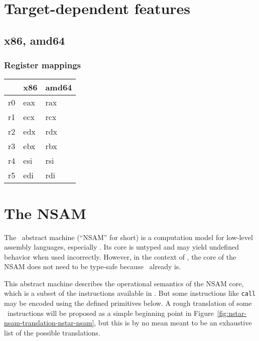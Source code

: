 \chapter{Target-dependent features}\label{chap:nstar-specific}

\section{x86, amd64}\label{sec:nstar-specific-x86amd64}

\subsection{Register mappings}\label{subsec:nstar-specific-x86amd64-registers}

\begin{tabularx}{\textwidth}{Y Y Y}
	\toprule
	\nstar & x86 & amd64 \\
	\midrule
	r0     & eax & rax   \\
	r1     & ecx & rcx   \\
	r2     & edx & rdx   \\
	r3     & ebx & rbx   \\
	r4     & esi & rsi   \\
	r5     & edi & rdi   \\
	\bottomrule
\end{tabularx}

\chapter{The NSAM}\label{chap:nstar-nsam}


The \nstar\ abstract machine (``NSAM'' for short) is a computation model for low-level assembly languages, especially \nstar.
Its core is untyped and may yield undefined behavior when used incorrectly.
However, in the context of \nstar, the core of the NSAM does not need to be type-safe because \nstar\ already is.

This abstract machine describes the operational semantics of the NSAM core, which is a subset of the instructions available in \nstar.
But some instructions like \texttt{call} may be encoded using the defined primitives below.
A rough translation of some \nstar\ instructions will be proposed as a simple beginning point in Figure~\ref{fig:nstar-nsam-translation-nstar-nsam}, but this is by no mean meant to be an exhaustive list of the possible translations.

